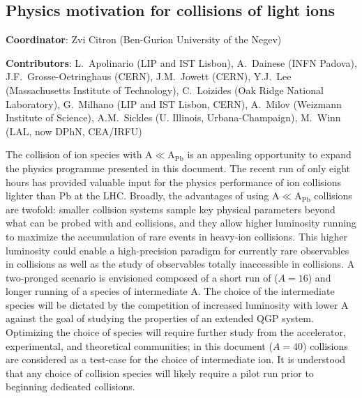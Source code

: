 \subsection{Physics motivation for collisions of light ions}
\label{sec:smallAsum}
{ \small
\noindent \textbf{Coordinator}: Zvi Citron (Ben-Gurion University of the Negev)

\noindent \textbf{Contributors}:
L.~Apolinario (LIP and IST Lisbon),
A.~Dainese (INFN Padova), 
J.F.~Grosse-Oetringhaus (CERN),
J.M.~Jowett (CERN),
Y.J.~Lee (Massachusetts Institute of Technology),
C.~Loizides (Oak Ridge National Laboratory),
G.~Milhano (LIP and IST Lisbon, CERN),
A.~Milov (Weizmann Institute of Science),
A.M.~Sickles (U. Illinois, Urbana-Champaign),
M.~Winn (LAL, now DPhN, CEA/IRFU)}

The collision of ion species with A$\ll$A$_\mathrm{Pb}$ is an appealing opportunity to expand the physics programme presented in this document.  The recent \XeXe run of only eight hours has provided valuable input for the physics performance of ion collisions lighter than Pb at the LHC.  Broadly, the advantages of using A$\ll$A$_\mathrm{Pb}$  collisions are twofold: smaller collision systems sample key physical parameters beyond what can be probed with \PbPb and \pPb collisions, and they allow higher luminosity running to maximize the accumulation of rare events in heavy-ion collisions.  This higher luminosity could enable a high-precision paradigm for currently rare observables in \PbPb collisions as well as the study of observables totally inaccessible in \PbPb collisions.        
A two-pronged scenario is envisioned composed of a short run of \OO  ($A=16$) and longer running of a species of intermediate A.  The choice of the intermediate species will be dictated by the competition of increased luminosity with lower A against the goal of studying the properties of an extended QGP system. Optimizing the choice of species will require further study from the accelerator, experimental, and theoretical communities; in this document \ArAr ($A=40$) collisions are considered as a test-case for the choice of intermediate ion.  It is understood that any choice of collision species will likely require a pilot run prior to beginning dedicated collisions.

